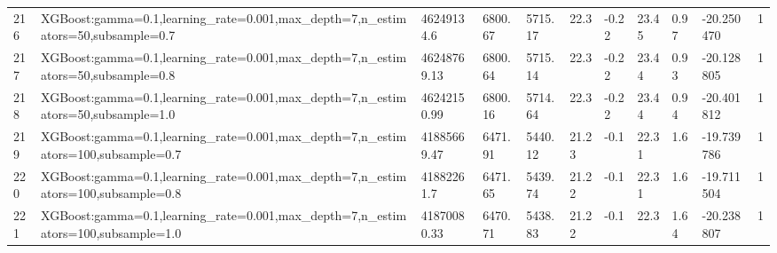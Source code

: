 \begin{longtable}{C{0.8cm} L{2cm} C{1.15cm} C{1.15cm} C{1.15cm} C{1.15cm} C{0.85cm} C{1.25cm} C{1.2cm} C{1.5cm} C{1.0cm}}
216 & XGBoost:\newline gamma=0.1,\newline learning\_rate=0.001,\newline max\_depth=7,\newline n\_estimators=50,\newline subsample=0.7 & 46249134.6 & 6800.67 & 5715.17 & 22.3 & -0.22 & 23.45 & 0.97 & -20.250470 & 1 \\
217 & XGBoost:\newline gamma=0.1,\newline learning\_rate=0.001,\newline max\_depth=7,\newline n\_estimators=50,\newline subsample=0.8 & 46248769.13 & 6800.64 & 5715.14 & 22.3 & -0.22 & 23.44 & 0.93 & -20.128805 & 1 \\
218 & XGBoost:\newline gamma=0.1,\newline learning\_rate=0.001,\newline max\_depth=7,\newline n\_estimators=50,\newline subsample=1.0 & 46242150.99 & 6800.16 & 5714.64 & 22.3 & -0.22 & 23.44 & 0.94 & -20.401812 & 1 \\
219 & XGBoost:\newline gamma=0.1,\newline learning\_rate=0.001,\newline max\_depth=7,\newline n\_estimators=100,\newline subsample=0.7 & 41885669.47 & 6471.91 & 5440.12 & 21.23 & -0.1 & 22.31 & 1.6 & -19.739786 & 1 \\
220 & XGBoost:\newline gamma=0.1,\newline learning\_rate=0.001,\newline max\_depth=7,\newline n\_estimators=100,\newline subsample=0.8 & 41882261.7 & 6471.65 & 5439.74 & 21.22 & -0.1 & 22.31 & 1.6 & -19.711504 & 1 \\
221 & XGBoost:\newline gamma=0.1,\newline learning\_rate=0.001,\newline max\_depth=7,\newline n\_estimators=100,\newline subsample=1.0 & 41870080.33 & 6470.71 & 5438.83 & 21.22 & -0.1 & 22.3 & 1.64 & -20.238807 & 1 \\

\end{longtable}
